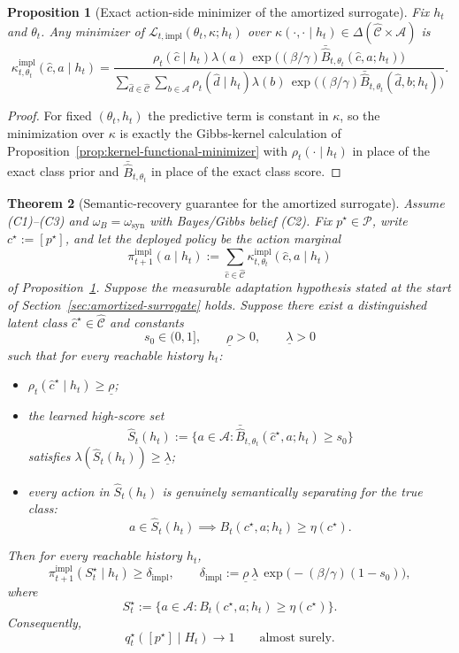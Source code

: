 \documentclass[11pt]{article}
\newtheorem{theorem}{Theorem}[section]
\newtheorem{proposition}[theorem]{Proposition}
\theoremstyle{definition}
\theoremstyle{remark}
\newcommand{\Acal}{\mathcal{A}}
\newcommand{\Ccal}{\mathcal{C}}
\newcommand{\Pcal}{\mathcal{P}}
\begin{document}
\begin{proposition}[Exact action-side minimizer of the amortized surrogate]
\label{prop:amortized-surrogate-minimizer}
Fix $h_t$ and $\theta_t$. Any minimizer of $\mathcal L_{t,\mathrm{impl}}(\theta_t,\kappa;h_t)$ over $\kappa(\cdot,\cdot\mid h_t)\in\Delta(\widehat{\Ccal}\times\Acal)$ is
\[
\kappa_{t,\theta_t}^{\mathrm{impl}}(\hat c,a\mid h_t)
=
\frac{
\rho_t(\hat c\mid h_t)\lambda(a)\,
\exp\!\bigl((\beta/\gamma)\bar{\widehat B}_{t,\theta_t}(\hat c,a;h_t)\bigr)}
{\sum_{\hat d\in\widehat{\Ccal}}\sum_{b\in\Acal}
\rho_t(\hat d\mid h_t)\lambda(b)\,
\exp\!\bigl((\beta/\gamma)\bar{\widehat B}_{t,\theta_t}(\hat d,b;h_t)\bigr)}.
\]
\end{proposition}

\begin{proof}
For fixed $(\theta_t,h_t)$ the predictive term is constant in $\kappa$, so the minimization over $\kappa$ is exactly the Gibbs-kernel calculation of Proposition~\ref{prop:kernel-functional-minimizer} with $\rho_t(\cdot\mid h_t)$ in place of the exact class prior and $\bar{\widehat B}_{t,\theta_t}$ in place of the exact class score.
\end{proof}

\begin{theorem}[Semantic-recovery guarantee for the amortized surrogate]
\label{thm:amortized-surrogate}
Assume \textup{(C1)--(C3)} and $\omega_B=\omega_{\mathrm{syn}}$ with Bayes/Gibbs belief \textup{(C2)}. Fix $p^\star\in\Pcal$, write $c^\star:=[p^\star]$, and let the deployed policy be the action marginal
\[
\pi_{t+1}^{\mathrm{impl}}(a\mid h_t)
:=
\sum_{\hat c\in\widehat{\Ccal}}
\kappa_{t,\theta_t}^{\mathrm{impl}}(\hat c,a\mid h_t)
\]
of Proposition~\ref{prop:amortized-surrogate-minimizer}. Suppose the measurable adaptation hypothesis stated at the start of Section~\ref{sec:amortized-surrogate} holds. Suppose there exist a distinguished latent class $\hat c^\star\in\widehat{\Ccal}$ and constants
\[
s_0\in(0,1],
\qquad
\underline\rho>0,
\qquad
\underline\lambda>0
\]
such that for every reachable history $h_t$:
\begin{itemize}
\item[(A1)] $\rho_t(\hat c^\star\mid h_t)\ge \underline\rho$;
\item[(A2)] the learned high-score set
\[
\widehat S_t(h_t)
:=
\{a\in\Acal:\bar{\widehat B}_{t,\theta_t}(\hat c^\star,a;h_t)\ge s_0\}
\]
satisfies $\lambda(\widehat S_t(h_t))\ge \underline\lambda$;
\item[(A3)] every action in $\widehat S_t(h_t)$ is genuinely semantically separating for the true class:
\[
a\in \widehat S_t(h_t)
\implies
B_t(c^\star,a;h_t)\ge \eta(c^\star).
\]
\end{itemize}
Then for every reachable history $h_t$,
\[
\pi_{t+1}^{\mathrm{impl}}(S_t^\star\mid h_t)\ge \delta_{\mathrm{impl}},
\qquad
\delta_{\mathrm{impl}}
:=
\underline\rho\,\underline\lambda\,
\exp\!\bigl(-(\beta/\gamma)(1-s_0)\bigr),
\]
where
\[
S_t^\star
:=
\{a\in\Acal:B_t(c^\star,a;h_t)\ge \eta(c^\star)\}.
\]
Consequently,
\[
q_t^\star([p^\star]\mid H_t)\longrightarrow 1
\qquad
\text{almost surely.}
\]
\end{theorem}
\end{document}
